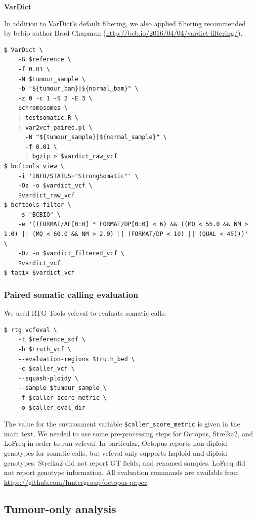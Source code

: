 \documentclass{article}
\begin{document}
\noindent \textbf{VarDict}

\noindent In addition to VarDict's default filtering, we also applied filtering recommended by bcbio author Brad Chapman (\url{http://bcb.io/2016/04/04/vardict-filtering/}).

\begin{lstlisting}
$ VarDict \
    -G $reference \
    -f 0.01 \
    -N $tumour_sample \
    -b "${tumour_bam}|${normal_bam}" \
    -z 0 -c 1 -S 2 -E 3 \
    $chromosomes \
    | testsomatic.R \
    | var2vcf_paired.pl \
      -N "${tumour_sample}|${normal_sample}" \
      -f 0.01 \
      | bgzip > $vardict_raw_vcf
$ bcftools view \
    -i 'INFO/STATUS="StrongSomatic"' \
    -Oz -o $vardict_vcf \
    $vardict_raw_vcf
$ bcftools filter \
    -s "BCBIO" \
    -e '((FORMAT/AF[0:0] * FORMAT/DP[0:0] < 6) && ((MQ < 55.0 && NM > 1.0) || (MQ < 60.0 && NM > 2.0) || (FORMAT/DP < 10) || (QUAL < 45)))' \
    -Oz -o $vardict_filtered_vcf \
    $vardict_vcf
$ tabix $vardict_vcf
\end{lstlisting}

\subsubsection*{Paired somatic calling evaluation}

\noindent We used RTG Tools vcfeval to evaluate somatic calls:

\begin{lstlisting}
$ rtg vcfeval \
    -t $reference_sdf \
    -b $truth_vcf \
    --evaluation-regions $truth_bed \
    -c $caller_vcf \
    --squash-ploidy \
    --sample $tumour_sample \
    -f $caller_score_metric \
    -o $caller_eval_dir
\end{lstlisting}

\noindent The value for the environment variable \lstinline!$caller_score_metric! is given in the main text. We needed to use some pre-processing steps for Octopus, Strelka2, and LoFreq in order to run vcfeval. In particular, Octopus reports non-diploid genotypes for somatic calls, but vcfeval only supports haploid and diploid genotypes. Strelka2 did not report GT fields, and renamed samples. LoFreq did not report genotype information. All evaluation commands are available from \url{https://github.com/luntergroup/octopus-paper}.

\subsection*{Tumour-only analysis}
\end{document}
